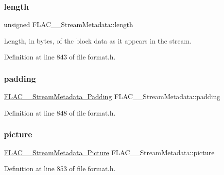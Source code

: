 \subsubsection{\texorpdfstring{length}{length}}
{\footnotesize\ttfamily unsigned F\+L\+A\+C\+\_\+\+\_\+\+Stream\+Metadata\+::length}

Length, in bytes, of the block data as it appears in the stream. 

Definition at line 843 of file format.\+h.

\mbox{\label{struct_f_l_a_c_____stream_metadata_a202f0ed2fa1dae32893be6025838f651}} 
\subsubsection{\texorpdfstring{padding}{padding}}
{\footnotesize\ttfamily \mbox{\hyperlink{struct_f_l_a_c_____stream_metadata___padding}{F\+L\+A\+C\+\_\+\+\_\+\+Stream\+Metadata\+\_\+\+Padding}} F\+L\+A\+C\+\_\+\+\_\+\+Stream\+Metadata\+::padding}



Definition at line 848 of file format.\+h.

\mbox{\label{struct_f_l_a_c_____stream_metadata_a203cf5cce24097ef96efd5dd3bb7c8e7}} 
\subsubsection{\texorpdfstring{picture}{picture}}
{\footnotesize\ttfamily \mbox{\hyperlink{struct_f_l_a_c_____stream_metadata___picture}{F\+L\+A\+C\+\_\+\+\_\+\+Stream\+Metadata\+\_\+\+Picture}} F\+L\+A\+C\+\_\+\+\_\+\+Stream\+Metadata\+::picture}



Definition at line 853 of file format.\+h.

\mbox{\label{struct_f_l_a_c_____stream_metadata_a3d27e525001843d173f8c97987663aa7}} 
